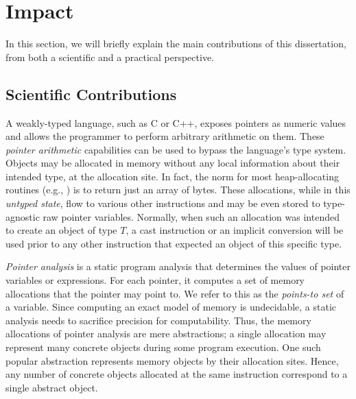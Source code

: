 \section{Impact}

In this section, we will briefly explain the main contributions of
this dissertation, from both a scientific and a practical perspective.

\subsection{Scientific Contributions}

A weakly-typed language, such as C or C++, exposes pointers as numeric
values and allows the programmer to perform arbitrary arithmetic on
them. These \emph{pointer arithmetic} capabilities can be used to
bypass the language's type system. Objects may be allocated in memory
without any local information about their intended type, at the
allocation site. In fact, the norm for most heap-allocating routines
(e.g., ) is to return just an array of bytes. These
allocations, while in this \emph{untyped state}, flow to various other
instructions and may be even stored to type-agnostic raw pointer
variables. Normally, when such an allocation was intended to create an
object of type \(T\), a cast instruction or an implicit conversion
will be used prior to any other instruction that expected an object of
this specific type.

\emph{Pointer analysis} is a static program analysis that determines
the values of pointer variables or expressions. For each pointer, it
computes a set of memory allocations that the pointer may point to. We
refer to this as the \emph{points-to set} of a variable. Since
computing an exact model of memory is undecidable, a static analysis
needs to sacrifice precision for computability. Thus, the memory
allocations of pointer analysis are mere abstractions; a single
allocation may represent many concrete objects during some program
execution. One such popular abstraction represents memory objects by
their allocation sites. Hence, any number of concrete objects
allocated at the same instruction correspond to a single abstract
object.

